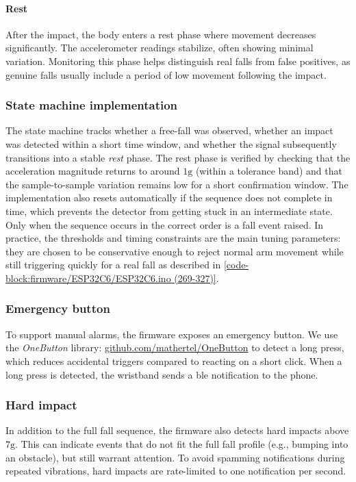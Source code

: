 \paragraph{Rest}
After the impact, the body enters a rest phase where movement decreases significantly. The accelerometer readings stabilize, often showing minimal variation. Monitoring this phase helps distinguish real falls from false positives, as genuine falls usually include a period of low movement following the impact.

\subsubsection{State machine implementation}
The state machine tracks whether a free-fall was observed, whether an impact was detected within a short time window, and whether the signal subsequently transitions into a stable \textit{rest} phase. The rest phase is verified by checking that the acceleration magnitude returns to around $1\mathrm{g}$ (within a tolerance band) and that the sample-to-sample variation remains low for a short confirmation window. The implementation also resets automatically if the sequence does not complete in time, which prevents the detector from getting stuck in an intermediate state. Only when the sequence occurs in the correct order is a fall event raised. In practice, the thresholds and timing constraints are the main tuning parameters: they are chosen to be conservative enough to reject normal arm movement while still triggering quickly for a real fall as described in \autoref{code-block:firmware/ESP32C6/ESP32C6.ino (269-327)}.


\subsubsection{Emergency button}
To support manual alarms, the firmware exposes an emergency button. We use the \textit{OneButton} library: \href{https://github.com/mathertel/OneButton}{github.com/mathertel/OneButton} to detect a long press, which reduces accidental triggers compared to reacting on a short click. When a long press is detected, the wristband sends a \gls{ble} notification to the phone.

\subsubsection{Hard impact}
In addition to the full fall sequence, the firmware also detects hard impacts above $7\mathrm{g}$. This can indicate events that do not fit the full fall profile (e.g., bumping into an obstacle), but still warrant attention. To avoid spamming notifications during repeated vibrations, hard impacts are rate-limited to one notification per second.

